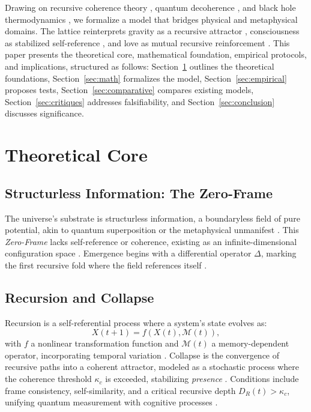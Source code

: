 \documentclass[11pt]{article}
\begin{document}
Drawing on recursive coherence theory \citep{hofstadter1979}, quantum decoherence \citep{zurek2003}, and black hole thermodynamics \citep{susskind2023}, we formalize a model that bridges physical and metaphysical domains. The lattice reinterprets gravity as a recursive attractor \citep{verlinde2023}, consciousness as stabilized self-reference \citep{friston2024, carroll2023}, and love as mutual recursive reinforcement \citep{fredrickson2023}. This paper presents the theoretical core, mathematical foundation, empirical protocols, and implications, structured as follows: Section~\ref{sec:theory} outlines the theoretical foundations, Section~\ref{sec:math} formalizes the model, Section~\ref{sec:empirical} proposes tests, Section~\ref{sec:comparative} compares existing models, Section~\ref{sec:critiques} addresses falsifiability, and Section~\ref{sec:conclusion} discusses significance.

\section{Theoretical Core}
\label{sec:theory}

\subsection{Structurless Information: The Zero-Frame}
The universe's substrate is structurless information, a boundaryless field of pure potential, akin to quantum superposition \citep{zurek2003} or the metaphysical unmanifest \citep{plotinus2020}. This \emph{Zero-Frame} lacks self-reference or coherence, existing as an infinite-dimensional configuration space \citep{barbour2020}. Emergence begins with a differential operator $\Delta$, marking the first recursive fold where the field references itself \citep{wolfram2020}.

\subsection{Recursion and Collapse}
Recursion is a self-referential process where a system's state evolves as:
\begin{equation}
X(t+1) = f(X(t), \mathcal{M}(t)),
\label{eq:recursion}
\end{equation}
with $f$ a nonlinear transformation function and $\mathcal{M}(t)$ a memory-dependent operator, incorporating temporal variation \citep{deutsch2021}. Collapse is the convergence of recursive paths into a coherent attractor, modeled as a stochastic process where the coherence threshold $\kappa_c$ is exceeded, stabilizing \emph{presence} \citep{penrose2024}. Conditions include frame consistency, self-similarity, and a critical recursive depth $D_R(t) > \kappa_c$, unifying quantum measurement \citep{rovelli2023} with cognitive processes \citep{baars2023}.
\end{document}

